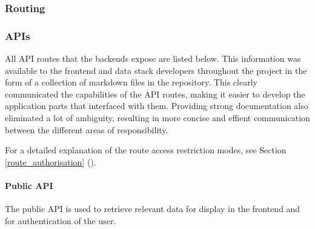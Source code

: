 \subsubsection{Routing}

\subsubsection{APIs}
All API routes that the backends expose are listed below. This information was
available to the frontend and data stack developers throughout the project in
the form of a collection of markdown files in the repository. This clearly
communicated the capabilities of the API routes, making it easier to develop the
application parts that interfaced with them. Providing strong documentation also
eliminated a lot of ambiguity, resulting in more concise and effient
communication between the different areas of responsibility.

For a detailed explanation of the route access restriction modes, see Section
\ref{route_authorisation} ().

\paragraph{Public API}
The public API is used to retrieve relevant data for display in the frontend and
for authentication of the user.


